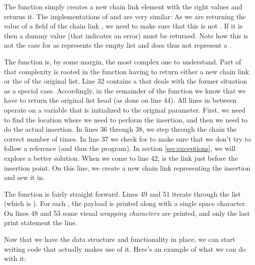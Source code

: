 The  function simply creates a new chain link element with the right values and returns it. The implementations of  and  are very similar: As we are returning the value of a field of the chain link , we need to make sure that this is not . If it is  then a dummy value (that indicates an error) must be returned. Note how this is not the case for  as  represents the empty list and does thus not represent a .

The  function is, by some margin, the most complex one to understand. Part of that complexity is rooted in the function having to return either a new chain link or the  of the original list. Line 32 contains a  that deals with the former situation as a special case. Accordingly, in the remainder of the function we know that we have to return the original list head (as done on line 44). All lines in between operate on a  variable that is initialized to the original  parameter. First, we need to find the location where we need to perform the insertion, and then we need to do the actual insertion. In lines 36 through 38, we step through the chain the correct number of times. In line 37 we check for  to make sure that we don't try to follow a  reference (and thus  the program). In section \ref{sec:exceptions}, we will explore a better solution. When we come to line 42,  is the link just before the insertion point. On this line, we create a new chain link representing the insertion and sew it in.

The  function is fairly straight forward. Lines 49 and 51 iterate through the list (which is ). For each , the payload is printed along with a single space character. On lines 48 and 53 some visual \textsl{wrapping characters} are printed, and only the last print statement  the line.

Now that we have the data structure and functionality in place, we can start writing code that actually makes use of it. Here's an example of what we can do with it:

